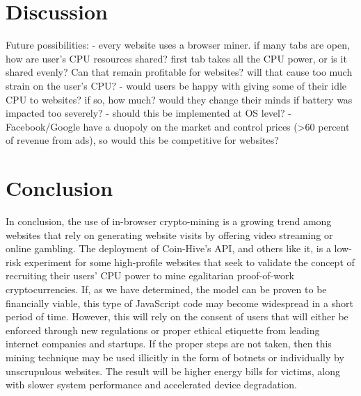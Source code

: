 \begin{center}
\end{center}

\section{Discussion}
Future possibilities:
	- every website uses a browser miner. if many tabs are open, how are user's CPU resources shared? first tab takes all the CPU 		power, or is it shared evenly? Can that remain profitable for websites? will that cause too much strain on the user's CPU?
	- would users be happy with giving some of their idle CPU to websites? if so, how much? would they change their minds if battery 	was impacted too severely?
	- should this be implemented at OS level?
	- Facebook/Google have a duopoly on the market and control prices (>60 percent of revenue from ads), so would this be 			competitive for websites?

\section{Conclusion}
In conclusion, the use of in-browser crypto-mining is a growing trend among websites that rely on generating website visits by offering video streaming or online gambling. The deployment of Coin-Hive’s API, and others like it, is a low-risk experiment for some high-profile websites that seek to validate the concept of recruiting their users’ CPU power to mine egalitarian proof-of-work cryptocurrencies. If, as we have determined, the model can be proven to be financially viable, this type of JavaScript code may become widespread in a short period of time. However, this will rely on the consent of users that will either be enforced through new regulations or proper ethical etiquette from leading internet companies and startups. If the proper steps are not taken, then this mining technique may be used illicitly in the form of botnets or individually by unscrupulous websites. The result will be higher energy bills for victims, along with slower system performance and accelerated device degradation.
